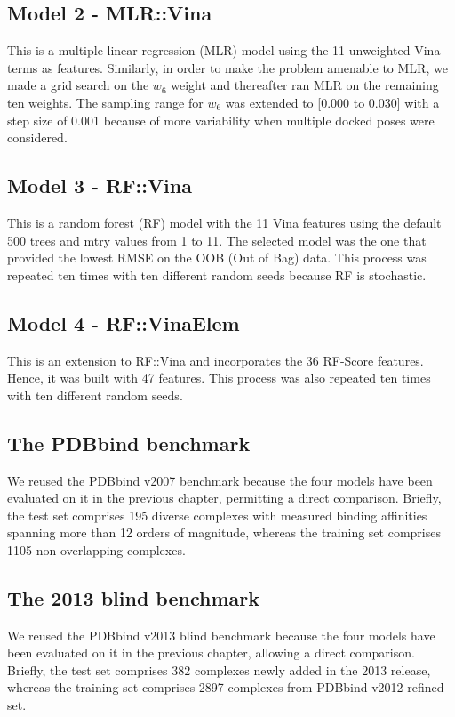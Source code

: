 \subsection{Model 2 - MLR::Vina}

This is a multiple linear regression (MLR) model using the 11 unweighted Vina terms as features. Similarly, in order to make the problem amenable to MLR, we made a grid search on the $w_6$ weight and thereafter ran MLR on the remaining ten weights. The sampling range for $w_6$ was extended to [0.000 to 0.030] with a step size of 0.001 because of more variability when multiple docked poses were considered.

\subsection{Model 3 - RF::Vina}

This is a random forest (RF) model with the 11 Vina features using the default 500 trees and mtry values from 1 to 11. The selected model was the one that provided the lowest RMSE on the OOB (Out of Bag) data. This process was repeated ten times with ten different random seeds because RF is stochastic.

\subsection{Model 4 - RF::VinaElem}

This is an extension to RF::Vina and incorporates the 36 RF-Score features. Hence, it was built with 47 features. This process was also repeated ten times with ten different random seeds.

\subsection{The PDBbind benchmark}

We reused the PDBbind v2007 benchmark because the four models have been evaluated on it in the previous chapter, permitting a direct comparison. Briefly, the test set comprises 195 diverse complexes with measured binding affinities spanning more than 12 orders of magnitude, whereas the training set comprises 1105 non-overlapping complexes.

\subsection{The 2013 blind benchmark}

We reused the PDBbind v2013 blind benchmark because the four models have been evaluated on it in the previous chapter, allowing a direct comparison. Briefly, the test set comprises 382 complexes newly added in the 2013 release, whereas the training set comprises 2897 complexes from PDBbind v2012 refined set.


